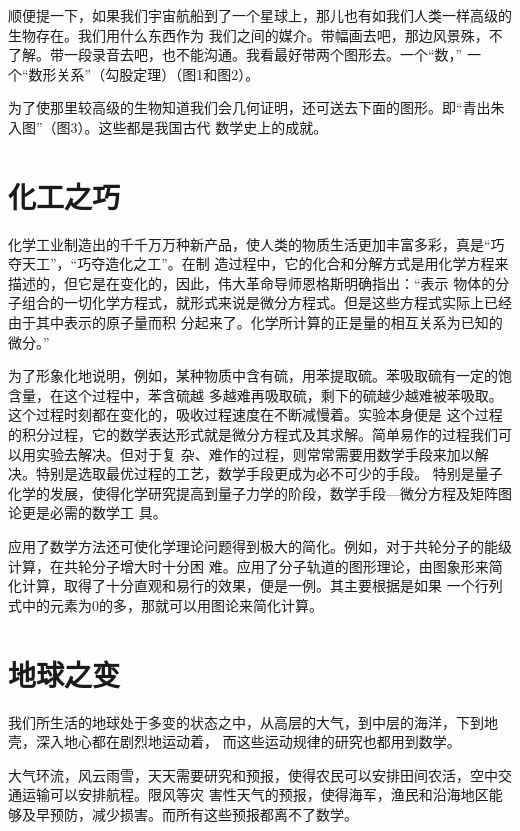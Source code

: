 \documentclass[twoside,openright,headings=optiontohead]{ctexbook} %
\begin{document}
{顺便提一下，如果我们宇宙航船到了一个星球上，那儿也有如我们人类一样高级的生物存在。我们用什么东西作为
我们之间的媒介。带幅画去吧，那边风景殊，不了解。带一段录音去吧，也不能沟通。我看最好带两个图形去。一个``数，''
一个``数形关系''（勾股定理）（图1和图2）。

为了使那里较高级的生物知道我们会几何证明，还可送去下面的图形。即``青出朱入图''（图3）。这些都是我国古代
数学史上的成就。

\hypertarget{ux5316ux5de5ux4e4bux5de7}{%
\section*{化工之巧}\label{ux5316ux5de5ux4e4bux5de7}}

化学工业制造出的千千万万种新产品，使人类的物质生活更加丰富多彩，真是``巧夺天工''，``巧夺造化之工''。在制
造过程中，它的化合和分解方式是用化学方程来描述的，但它是在变化的，因此，伟大革命导师恩格斯明确指出：``表示
物体的分子组合的一切化学方程式，就形式来说是微分方程式。但是这些方程式实际上已经由于其中表示的原子量而积
分起来了。化学所计算的正是量的相互关系为已知的微分。''

为了形象化地说明，例如，某种物质中含有硫，用苯提取硫。苯吸取硫有一定的饱含量，在这个过程中，苯含硫越
多越难再吸取硫，剩下的硫越少越难被苯吸取。这个过程时刻都在变化的，吸收过程速度在不断减慢着。实验本身便是
这个过程的积分过程，它的数学表达形式就是微分方程式及其求解。简单易作的过程我们可以用实验去解决。但对于复
杂、难作的过程，则常常需要用数学手段来加以解决。特别是选取最优过程的工艺，数学手段更成为必不可少的手段。
特别是量子化学的发展，使得化学研究提高到量子力学的阶段，数学手段---微分方程及矩阵图论更是必需的数学工
具。

应用了数学方法还可使化学理论问题得到极大的简化。例如，对于共轮分子的能级计算，在共轮分子增大时十分困
难。应用了分子轨道的图形理论，由图象形来简化计算，取得了十分直观和易行的效果，便是一例。其主要根据是如果
一个行列式中的元素为0的多，那就可以用图论来简化计算。

\hypertarget{ux5730ux7403ux4e4bux53d8}{%
\section*{地球之变}\label{ux5730ux7403ux4e4bux53d8}}

我们所生活的地球处于多变的状态之中，从高层的大气，到中层的海洋，下到地壳，深入地心都在剧烈地运动着，
而这些运动规律的研究也都用到数学。

大气环流，风云雨雪，天天需要研究和预报，使得农民可以安排田间农活，空中交通运输可以安排航程。限风等灾
害性天气的预报，使得海军，渔民和沿海地区能够及早预防，减少损害。而所有这些预报都离不了数学。

}
\end{document}
